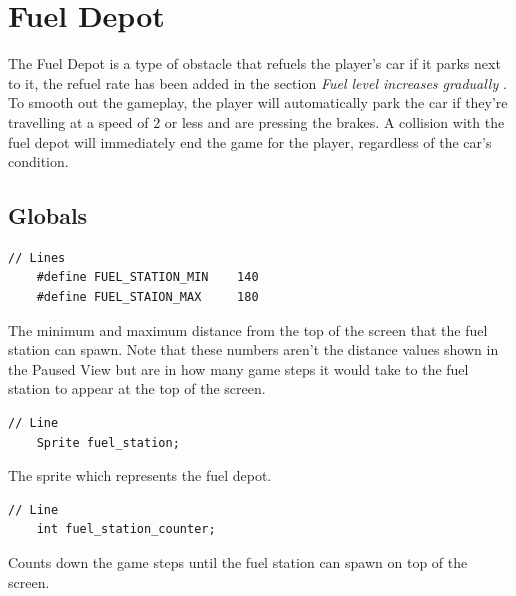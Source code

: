 \documentclass{article}
\begin{document}
\section{Fuel Depot}
The Fuel Depot is a type of obstacle that refuels the player's car if it parks next to it, the refuel rate has been added in the section \emph{Fuel level increases gradually }. To smooth out the gameplay, the player will automatically park the car if they're travelling at a speed of 2 or less and are pressing the brakes. A collision with the fuel depot will immediately end the game for the player, regardless of the car's condition.

\subsection*{Globals}
\begin{lstlisting}[style=CStyle]
	// Lines
	#define FUEL_STATION_MIN    140    
	#define FUEL_STAION_MAX     180
\end{lstlisting}
The minimum and maximum distance from the top of the screen that the fuel station can spawn. Note that these numbers aren't the distance values shown in the Paused View but are in how many game steps it would take to the fuel station to appear at the top of the screen.
\begin{lstlisting}[style=CStyle]
	// Line 
	Sprite fuel_station;
\end{lstlisting}
The sprite which represents the fuel depot.
\begin{lstlisting}[style=CStyle]
	// Line
	int fuel_station_counter; 
\end{lstlisting}
Counts down the game steps until the fuel station can spawn on top of the screen.
\newline
\end{document}
